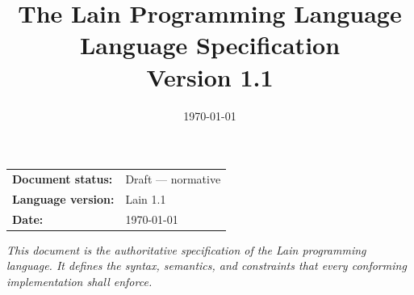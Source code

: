 \documentclass[11pt,a4paper,twoside,openright]{book}
\title{%
  \vspace{-2cm}
  {\LARGE\bfseries\color{lain-blue} The Lain Programming Language}\\[0.8em]
  {\large Language Specification}\\[0.4em]
  {\normalsize Version 1.1}
}
\author{}
\date{\today}
\begin{document}
\frontmatter

\maketitle
\thispagestyle{empty}

\vfill
\noindent
\begin{tabular}{ll}
  \textbf{Document status:} & Draft --- normative \\
  \textbf{Language version:} & Lain 1.1 \\
  \textbf{Date:}             & \today \\
\end{tabular}
\vfill
\noindent\textit{%
  This document is the authoritative specification of the Lain programming
  language.  It defines the syntax, semantics, and constraints that every
  conforming implementation shall enforce.
}
\clearpage

\tableofcontents
\clearpage



\mainmatter























\appendix






\backmatter

\printindex
\end{document}
